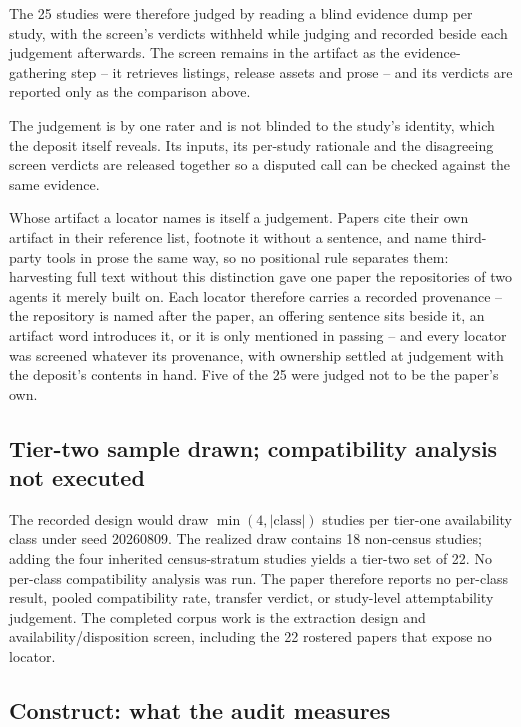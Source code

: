 The 25 studies were therefore judged by reading a blind evidence dump per study, with the
screen's verdicts withheld while judging and recorded beside each judgement afterwards. The
screen remains in the artifact as the evidence-gathering step -- it retrieves listings,
release assets and prose -- and its verdicts are reported only as the comparison above.

The judgement is by one rater and is not blinded to the study's identity, which the deposit
itself reveals. Its inputs, its per-study rationale and the disagreeing screen verdicts are
released together so a disputed call can be checked against the same evidence.

Whose artifact a locator names is itself a judgement. Papers cite their own artifact in their
reference list, footnote it without a sentence, and name third-party tools in prose the same
way, so no positional rule separates them: harvesting full text without this distinction gave
one paper the repositories of two agents it merely built on. Each locator therefore carries a
recorded provenance -- the repository is named after the paper, an offering sentence sits
beside it, an artifact word introduces it, or it is only mentioned in passing -- and every
locator was screened whatever its provenance, with ownership settled at judgement with the
deposit's contents in hand. Five of the 25 were judged not to be the paper's own.

\subsection{Tier-two sample drawn; compatibility analysis not executed}

The recorded design would draw $\min(4, |\text{class}|)$ studies per tier-one availability
class under seed 20260809. The realized draw contains 18 non-census studies; adding the four
inherited census-stratum studies yields a tier-two set of 22. No per-class compatibility analysis
was run. The paper therefore reports no per-class result, pooled compatibility rate, transfer
verdict, or study-level attemptability judgement. The completed corpus work is the extraction
design and availability/disposition screen, including the 22 rostered papers that expose no
locator.

\subsection{Construct: what the audit measures}

